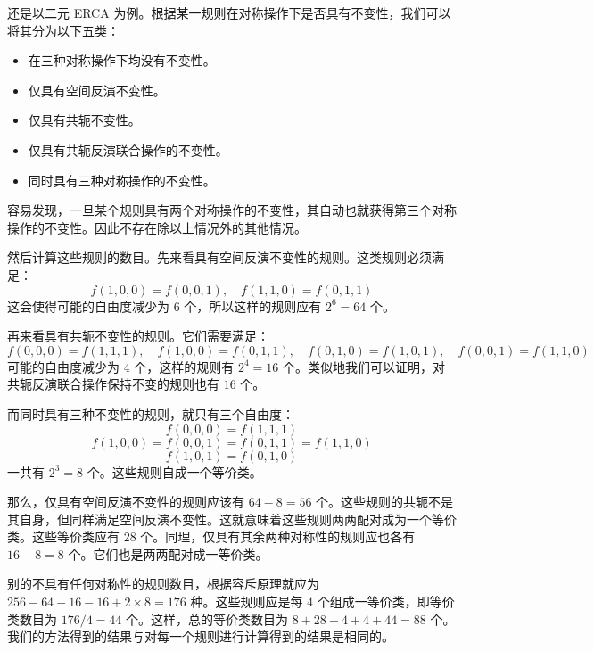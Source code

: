 \documentclass[reprint, amsmath, amssymb, aps, physrev,prb]{revtex4-2}
\begin{document}
还是以二元 ERCA 为例。根据某一规则在对称操作下是否具有不变性，我们可以将其分为以下五类：
\begin{itemize}
\item 在三种对称操作下均没有不变性。
\item 仅具有空间反演不变性。
\item 仅具有共轭不变性。
\item 仅具有共轭反演联合操作的不变性。
\item 同时具有三种对称操作的不变性。
\end{itemize}
容易发现，一旦某个规则具有两个对称操作的不变性，其自动也就获得第三个对称操作的不变性。因此不存在除以上情况外的其他情况。

然后计算这些规则的数目。先来看具有空间反演不变性的规则。这类规则必须满足：
\[ f(1,0,0) = f(0,0,1), \quad f(1,1,0) = f(0,1,1) \]
这会使得可能的自由度减少为 $6$ 个，所以这样的规则应有 $2^6 = 64$ 个。

再来看具有共轭不变性的规则。它们需要满足：
\[ f(0,0,0) = f(1,1,1), \quad f(1,0,0) = f(0,1,1), \quad f(0,1,0) = f(1,0,1), \quad f(0,0,1) = f(1,1,0) \]
可能的自由度减少为 $4$ 个，这样的规则有 $2^4 = 16$ 个。类似地我们可以证明，对共轭反演联合操作保持不变的规则也有 $16$ 个。

而同时具有三种不变性的规则，就只有三个自由度：
\[ f(0,0,0) = f(1,1,1) \]
\[ f(1,0,0) = f(0,0,1) = f(0,1,1) = f(1,1,0) \]
\[ f(1,0,1) = f(0,1,0) \]
一共有 $2^3 = 8$ 个。这些规则自成一个等价类。

那么，仅具有空间反演不变性的规则应该有 $64 - 8 = 56$ 个。这些规则的共轭不是其自身，但同样满足空间反演不变性。这就意味着这些规则两两配对成为一个等价类。这些等价类应有 $28$ 个。同理，仅具有其余两种对称性的规则应也各有 $16 - 8 = 8$ 个。它们也是两两配对成一等价类。

别的不具有任何对称性的规则数目，根据容斥原理就应为 $256 - 64 - 16 - 16 + 2 \times 8 = 176$ 种。这些规则应是每 $4$ 个组成一等价类，即等价类数目为 $176/4 = 44$ 个。这样，总的等价类数目为 $8 + 28 + 4 + 4 + 44 = 88$ 个。我们的方法得到的结果与对每一个规则进行计算得到的结果是相同的。
\end{document}

